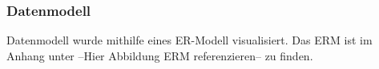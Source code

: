 \subsubsection{Datenmodell}
Datenmodell wurde mithilfe eines ER-Modell visualisiert.
Das ERM ist im Anhang unter --Hier Abbildung ERM referenzieren-- zu finden.
